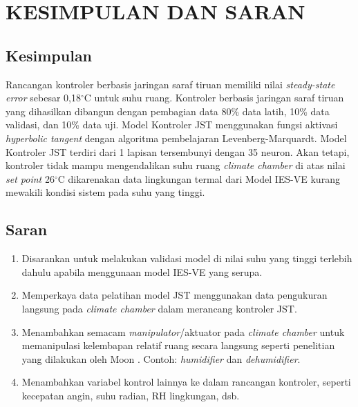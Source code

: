 \chapter{KESIMPULAN DAN SARAN}
\label{kesimpulan-dan-saran}

\section{Kesimpulan}
Rancangan kontroler berbasis jaringan saraf tiruan memiliki nilai \textit{steady-state error} sebesar 0,18$^\circ$C untuk suhu ruang. Kontroler berbasis jaringan saraf tiruan yang dihasilkan dibangun dengan pembagian data 80\% data latih, 10\% data validasi, dan 10\% data uji. Model Kontroler JST menggunakan fungsi aktivasi \textit{hyperbolic tangent} dengan algoritma pembelajaran Levenberg-Marquardt. Model Kontroler JST terdiri dari 1 lapisan tersembunyi dengan 35 neuron. Akan tetapi, kontroler tidak mampu mengendalikan suhu ruang \textit{climate chamber} di atas nilai \textit{set point} 26$^\circ$C dikarenakan data lingkungan termal dari Model IES-VE kurang mewakili kondisi sistem pada suhu yang tinggi.

\section{Saran}

\begin{enumerate}
	\item Disarankan untuk melakukan validasi model di nilai suhu yang tinggi terlebih dahulu apabila menggunaan model IES-VE yang serupa.
	\item Memperkaya data pelatihan model JST menggunakan data pengukuran langsung pada \textit{climate chamber} dalam merancang kontroler JST.
	\item Menambahkan semacam \textit{manipulator}/aktuator pada \textit{climate chamber} untuk memanipulasi kelembapan relatif ruang secara langsung seperti penelitian yang dilakukan oleh Moon \cite{paper22JJkim}. Contoh: \textit{humidifier} dan \textit{dehumidifier}.
	\item Menambahkan variabel kontrol lainnya ke dalam rancangan kontroler, seperti kecepatan angin, suhu radian, RH lingkungan, dsb.
\end{enumerate}